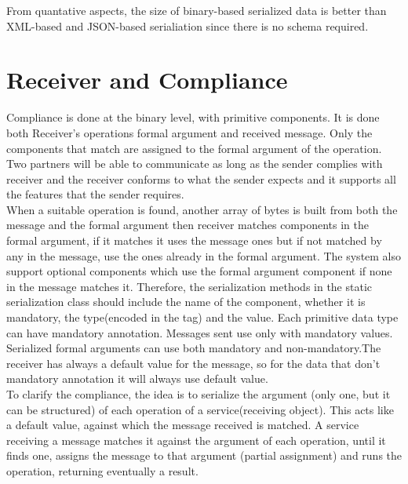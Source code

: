 From quantative aspects, the size of binary-based serialized data is better than XML-based and JSON-based serialiation since there is no schema required.



\section{Receiver and Compliance}
\label{section:compliance}

Compliance is done at the binary level, with primitive components. It is done both  Receiver's operations formal argument and received message. Only the components that match are assigned to the formal argument of the operation. Two partners will be able to communicate as long as the sender complies with receiver and the receiver conforms to what the sender expects and it supports all the features that the sender requires.\\

When a suitable operation is found, another array of bytes is built from both the message and the formal argument then receiver matches components in the formal argument, if it matches it uses the message ones but if not matched by any in the message, use the ones already in the formal argument. The system  also support optional components which use the formal argument component if none in the message matches it. Therefore, the serialization methods in the static serialization class should include the name of the component, whether it is mandatory, the type(encoded in the tag) and the value. Each primitive data type can have mandatory annotation. Messages sent use only with mandatory values. Serialized formal arguments can use both mandatory and non-mandatory.The receiver has always a default value for the message, so for the data that don't mandatory annotation it will always use default value.\\  

To clarify the compliance, the idea is to serialize the argument (only one, but it can be structured) of each operation of a service(receiving object). This acts like a default value, against which the message received is matched. A service receiving a message matches it against the argument of each operation, until it finds one, assigns the message to that argument (partial assignment) and runs the operation, returning eventually a result.\\

